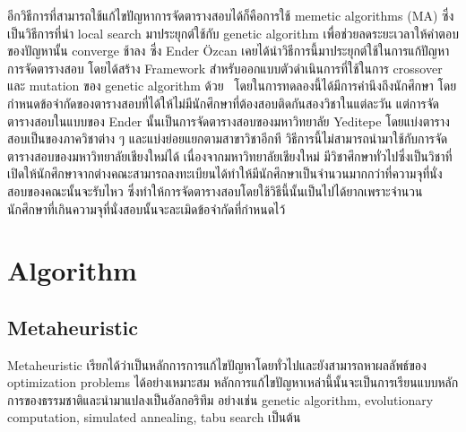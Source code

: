 อีกวิธีการที่สามารถใช้แก้ไขปัญหาการจัดตารางสอบได้ก็คือการใช้ memetic algorithms (MA) ซึ่งเป็นวิธีการที่นำ local search มาประยุกต์ใช้กับ genetic algorithm 
เพื่อช่วยลดระยะเวลาให้คำตอบของปัญหานั้น converge ช้าลง \cite{pablo-memetic-algo} ซึ่ง Ender {\"O}zcan เคยได้นำวิธีการนี้มาประยุกต์ใช้ในการแก้ปัญหาการจัดตารางสอบ 
โดยได้สร้าง Framework สำหรับออกแบบตัวดำเนินการที่ใช้ในการ crossover และ mutation ของ genetic algorithm ด้วย~\cite{fes}
โดยในการทดลองนี้ได้มีการคำนึงถึงนักศึกษา โดยกำหนดข้อจำกัดของตารางสอบที่ได้ให้ไม่มีนักศึกษาที่ต้องสอบติดกันสองวิชาในแต่ละวัน แต่การจัดตารางสอบในแบบของ Ender 
นั้นเป็นการจัดตารางสอบของมหาวิทยาลัย Yeditepe โดยแบ่งตารางสอบเป็นของภาควิชาต่าง ๆ และแบ่งย่อยแยกตามสาขาวิชาอีกที วิธีการนี้ไม่สามารถนำมาใช้กับการจัดตารางสอบของมหาวิทยาลัยเชียงใหม่ได้
เนื่องจากมหาวิทยาลัยเชียงใหม่ มีวิชาศึกษาทั่วไปซึ่งเป็นวิชาที่เปิดให้นักศึกษาจากต่างคณะสามารถลงทะเบียนได้ทำให้มีนักศึกษาเป็นจำนวนมากกว่าที่ความจุที่นั่งสอบของคณะนั้นจะรับไหว
ซึ่งทำให้การจัดตารางสอบโดยใช้วิธีนี้นั้นเป็นไปได้ยากเพราะจำนวนนักศึกษาที่เกินความจุที่นั่งสอบนั้นจะละเมิดข้อจำกัดที่กำหนดไว้ 

\iffalse
\section{Tools}
\subsection{Gurobi Optimizer}
Gurobi Optimizer เป็น Solver ที่ใช้สำหรับแก้ปัญหา optimization โดยที่จะเน้นไปทางด้านของปัญหาต่าง ๆ ดังนี้ 
\begin{itemize}
  \item Linear programming (LP)
  \item Mixed-integer linear programming (MILP)
  \item Quadratic programming (QP)
  \item Mixed-integer quadratic programming (MIQP)
  \item Quadratically-constrained programming (QCP)
  \item Mixed-integer quadratically-constrained programming (MIQCP)
\end{itemize}
ผลลัพธ์ที่ได้จาก Gurobi Optimizer อาจนำมาใช้เป็นตัวเปรียบเทียบประสิทธิภาพกับผลลัพธ์การทำงานที่ได้จากอัลกอลิทึมของเรา
\fi
\section{Algorithm}
\subsection{Metaheuristic}
Meta­heuristic \cite{metaheuris} เรียกได้ว่าเป็นหลักการการแก้ไขปัญหาโดยทั่วไปและยังสามารถหาผลลัพธ์ของ optimization problems ได้อย่างเหมาะสม
หลักการแก้ไขปัญหาเหล่านี้นั้นจะเป็นการเรียนแบบหลักการของธรรมชาติและนำมาแปลงเป็นอัลกอริทึม อย่างเช่น genetic algorithm, evolutionary computation, simulated annealing, tabu search เป็นต้น
